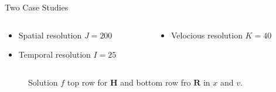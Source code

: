 \documentclass[usenames,dvipsnames,Nike,mathserif]{tuberlinbeamer}
\begin{document}
\begin{frame}[fragile]{Two Case Studies}
	\begin{columns}
		\begin{column}{.5\textwidth}

			\begin{itemize}
				\item Spatial resolution $J = 200$
				\item Temporal resolution $I = 25$
			\end{itemize}
		\end{column}
		\begin{column}{.5\textwidth}
			\begin{itemize}
				\item Velocious resolution $K = 40$
			\end{itemize}
		\end{column}
	\end{columns}
	\begin{figure}
		 
		 \caption{Solution $f$ top row for $\mathbf{H}$ and bottom row fro $\mathbf{R}$ in $x$ and $v$.}
	\end{figure}
\end{frame}
\end{document}
